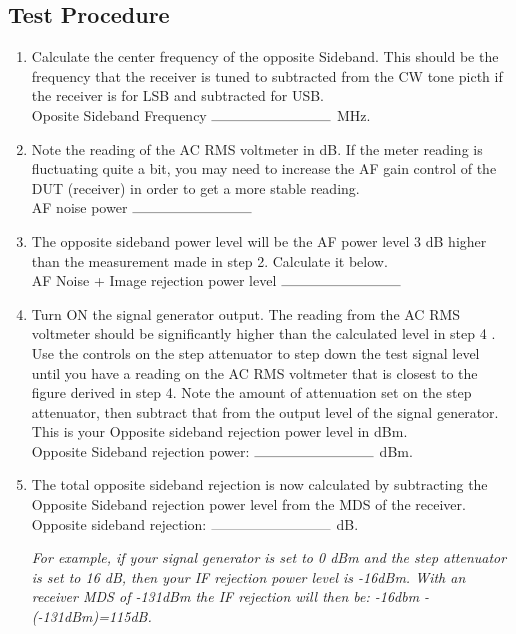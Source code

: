 \documentclass[10pt,letterpaper]{book}
\begin{document}
\subsection*{Test Procedure}
\begin{enumerate}
	\item Calculate the center frequency of the opposite Sideband. This should be the frequency that the receiver is tuned to subtracted from the CW tone picth if the receiver is for LSB and subtracted for USB.
	\vspace{30pt}
	\\Oposite Sideband Frequency $\rule{3cm}{0.1mm}$ MHz.

	\item Note the reading of the AC RMS voltmeter in dB. If the meter reading is fluctuating quite a bit, you may need to increase the AF gain control of the DUT (receiver) in order to get a more stable reading.
	\vspace{30pt}
	\\AF noise power $\rule{3cm}{0.1mm}$ 

	\item  The opposite sideband power level will be the AF power level 3 dB higher than the measurement made in step 2. Calculate it below.
	\vspace{30pt}
	\\AF Noise + Image rejection power level $\rule{3cm}{0.1mm}$ 

	\item Turn ON the signal generator output. The reading from the AC RMS voltmeter should be significantly higher than the calculated level in step 4 . Use the controls on the step attenuator to step down the test signal level until you have a reading on the AC RMS voltmeter that is closest to the figure derived in step 4. Note the amount of attenuation set on the step attenuator, then subtract that from the output level of the signal generator. This is your Opposite sideband rejection power level in dBm.
	\vspace{30pt}
	\\Opposite Sideband rejection power: $\rule{3cm}{0.1mm}$ dBm.
	 
	\item  The total opposite sideband rejection is now calculated by subtracting the Opposite Sideband rejection power level from the MDS of the receiver.
	\vspace{30pt}
	 \\Opposite sideband rejection: $\rule{3cm}{0.1mm}$ dB.

	\emph{For example, if your signal generator is set to 0 dBm and the step attenuator is set to 16 dB, then your IF rejection power level is -16dBm. With an receiver MDS of -131dBm the IF rejection will then be: -16dbm -(-131dBm)=115dB.}
\end{enumerate}
\end{document}
